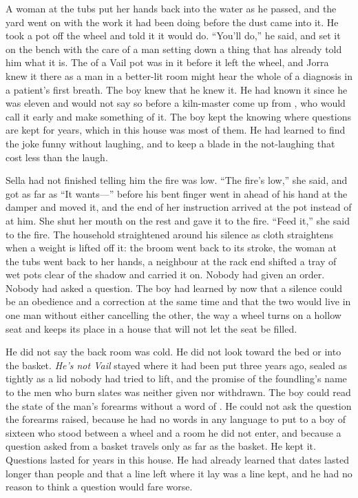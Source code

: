 A woman at the tubs put her hands back into the water as he passed, and the yard went on with the work it had been doing before the dust came into it. He took a pot off the wheel and told it it would do. “You'll do,” he said, and set it on the bench with the care of a man setting down a thing that has already told him what it is. The  of a Vail pot was in it before it left the wheel, and Jorra knew it there as a man in a better-lit room might hear the whole of a diagnosis in a patient's first breath. The boy knew that he knew it. He had known it since he was eleven and would not say so before a kiln-master come up from , who would call it early and make something of it. The boy kept the knowing where questions are kept for years, which in this house was most of them. He had learned to find the joke funny without laughing, and to keep a blade in the not-laughing that cost less than the laugh.

Sella had not finished telling him the fire was low. “The fire's low,” she said, and got as far as “It wants---” before his bent finger went in ahead of his hand at the damper and moved it, and the end of her instruction arrived at the pot instead of at him. She shut her mouth on the rest and gave it to the fire. “Feed it,” she said to the fire. The household straightened around his silence as cloth straightens when a weight is lifted off it: the broom went back to its stroke, the woman at the tubs went back to her hands, a neighbour at the rack end shifted a tray of wet pots clear of the shadow and carried it on. Nobody had given an order. Nobody had asked a question. The boy had learned by now that a silence could be an obedience and a correction at the same time and that the two would live in one man without either cancelling the other, the way a wheel turns on a hollow seat and keeps its place in a house that will not let the seat be filled.

He did not say the back room was cold. He did not look toward the bed or into the basket. \emph{He's not Vail} stayed where it had been put three years ago, sealed as tightly as a lid nobody had tried to lift, and the promise of the foundling's name to the men who burn slates was neither given nor withdrawn. The boy could read the state of the man's forearms without a word of . He could not ask the question the forearms raised, because he had no words in any language to put to a boy of sixteen who stood between a wheel and a room he did not enter, and because a question asked from a basket travels only as far as the basket. He kept it. Questions lasted for years in this house. He had already learned that dates lasted longer than people and that a line left where it lay was a line kept, and he had no reason to think a question would fare worse.

